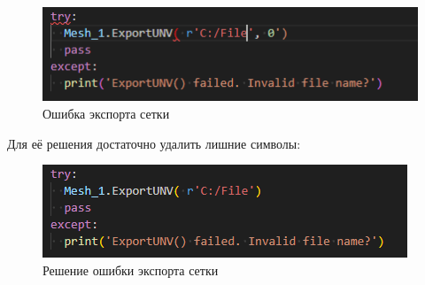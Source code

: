 \documentclass[a4paper,12pt]{article}
\theoremstyle{plain} %
\theoremstyle{definition} %
\theoremstyle{remark} %
\begin{document}
\begin{figure}[h]
	\begin{center}
		\includegraphics[width=1\linewidth]{e.png}
		\caption{Ошибка экспорта сетки} %
	\end{center}
\end{figure}

Для её решения достаточно удалить лишние символы:
\begin{figure}[h]
	\begin{center}
		\includegraphics[width=1\linewidth]{er.png}
		\caption{Решение ошибки экспорта сетки} %
	\end{center}
\end{figure}
\end{document}
